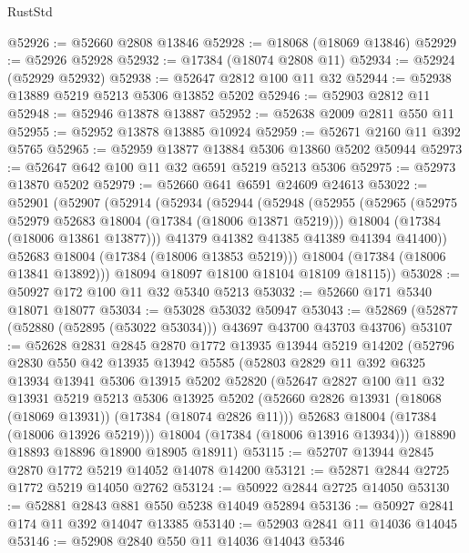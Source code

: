 \begin{lexlean}{RustStd}
\begin{coremodule}
@52926 := @52660 @2808 @13846
@52928 := @18068 (@18069 @13846)
@52929 := @52926 @52928
@52932 := @17384 (@18074 @2808 @11)
@52934 := @52924 (@52929 @52932)
@52938 := @52647 @2812 @100 @11 @32
@52944 := @52938 @13889 @5219 @5213 @5306 @13852 @5202
@52946 := @52903 @2812 @11
@52948 := @52946 @13878 @13887
@52952 := @52638 @2009 @2811 @550 @11
@52955 := @52952 @13878 @13885 @10924
@52959 := @52671 @2160 @11 @392 @5765
@52965 := @52959 @13877 @13884 @5306 @13860 @5202 @50944
@52973 := @52647 @642 @100 @11 @32 @6591 @5219 @5213 @5306
@52975 := @52973 @13870 @5202
@52979 := @52660 @641 @6591 @24609 @24613
@53022 := @52901
    (@52907
      (@52914
        (@52934
          (@52944
            (@52948
              (@52955
                (@52965
                  (@52975 @52979 @52683 @18004 (@17384 (@18006 @13871 @5219)))
                  @18004
                  (@17384 (@18006 @13861 @13877)))
                @41379
                @41382
                @41385
                @41389
                @41394
                @41400))
            @52683
            @18004
            (@17384 (@18006 @13853 @5219)))
          @18004
          (@17384 (@18006 @13841 @13892)))
        @18094
        @18097
        @18100
        @18104
        @18109
        @18115))
@53028 := @50927 @172 @100 @11 @32 @5340 @5213
@53032 := @52660 @171 @5340 @18071 @18077
@53034 := @53028 @53032 @50947
@53043 := @52869 (@52877 (@52880 (@52895 (@53022 @53034))) @43697 @43700 @43703 @43706)
@53107 := @52628
    @2831
    @2845
    @2870
    @1772
    @13935
    @13944
    @5219
    @14202
    (@52796
      @2830
      @550
      @42
      @13935
      @13942
      @5585
      (@52803
        @2829
        @11
        @392
        @6325
        @13934
        @13941
        @5306
        @13915
        @5202
        @52820
        (@52647
          @2827
          @100
          @11
          @32
          @13931
          @5219
          @5213
          @5306
          @13925
          @5202
          (@52660 @2826 @13931 (@18068 (@18069 @13931)) (@17384 (@18074 @2826 @11)))
          @52683
          @18004
          (@17384 (@18006 @13926 @5219)))
        @18004
        (@17384 (@18006 @13916 @13934)))
      @18890
      @18893
      @18896
      @18900
      @18905
      @18911)
@53115 := @52707 @13944 @2845 @2870 @1772 @5219 @14052 @14078 @14200
@53121 := @52871 @2844 @2725 @1772 @5219 @14050 @2762
@53124 := @50922 @2844 @2725 @14050
@53130 := @52881 @2843 @881 @550 @5238 @14049 @52894
@53136 := @50927 @2841 @174 @11 @392 @14047 @13385
@53140 := @52903 @2841 @11 @14036 @14045
@53146 := @52908 @2840 @550 @11 @14036 @14043 @5346

\end{coremodule}
\end{lexlean}
